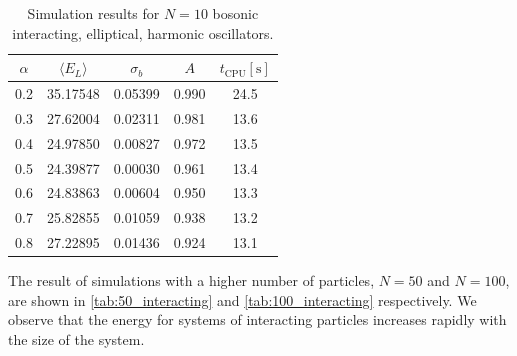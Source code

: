 \documentclass[
    a4paper, aps, twocolumn, floatfix, superscriptaddress,
    nofootinbib]{revtex4-1}
\newcommand{\1}{\mathds{1}}
\begin{document}
        \begin{table}
            \caption{Simulation results for $N = 10$ bosonic interacting,
            elliptical, harmonic oscillators.}
            \centering
            \begin{ruledtabular}
                \begin{tabular}{ccccc}
                    $\alpha$ & $\langle  E_L\rangle$ & $\sigma_b$
                    &$A$ & $t_{\text{CPU}} [\si{\second}]$ \\
                    \hline
                    0.2&35.17548&0.05399&0.990%
                    &24.5\\%
                    0.3&27.62004&0.02311&0.981%
                    &13.6\\%
                    0.4&24.97850&0.00827&0.972%
                    &13.5\\%
                    0.5&24.39877&0.00030&0.961%
                    &13.4\\%
                    0.6&24.83863&0.00604&0.950%
                    &13.3\\%
                    0.7&25.82855&0.01059&0.938%
                    &13.2\\%
                    0.8&27.22895&0.01436&0.924%
                    &13.1\\%
                \end{tabular}
            \end{ruledtabular}
            \label{tab:10_interacting}
        \end{table}

        The result of simulations with a higher number of particles, $N=50$ and
        $N=100$, are  shown in \autoref{tab:50_interacting} and
        \autoref{tab:100_interacting} respectively. We observe that the energy
        for systems of interacting particles increases rapidly with the size of
        the system.
\end{document}
